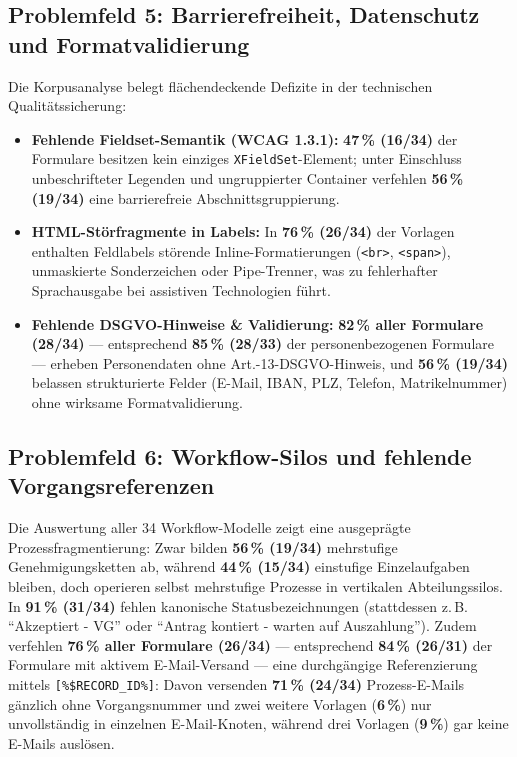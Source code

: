 \subsection{Problemfeld 5: Barrierefreiheit, Datenschutz und Formatvalidierung}
\label{subsec:problem_a11y}
Die Korpusanalyse belegt flächendeckende Defizite in der technischen Qualitätssicherung:
\begin{itemize}
    \item \textbf{Fehlende Fieldset-Semantik (WCAG 1.3.1):} \textbf{47\,\% (16/34)} der Formulare besitzen kein einziges \texttt{XFieldSet}-Element; unter Einschluss unbeschrifteter Legenden und ungruppierter Container verfehlen \textbf{56\,\% (19/34)} eine barrierefreie Abschnittsgruppierung.
    \item \textbf{HTML-Störfragmente in Labels:} In \textbf{76\,\% (26/34)} der Vorlagen enthalten Feldlabels störende Inline-Formatierungen (\texttt{<br>}, \texttt{<span>}), unmaskierte Sonderzeichen oder Pipe-Trenner, was zu fehlerhafter Sprachausgabe bei assistiven Technologien führt.
    \item \textbf{Fehlende DSGVO-Hinweise \& Validierung:} \textbf{82\,\% aller Formulare (28/34)} --- entsprechend \textbf{85\,\% (28/33)} der personenbezogenen Formulare --- erheben Personendaten ohne Art.-13-DSGVO-Hinweis, und \textbf{56\,\% (19/34)} belassen strukturierte Felder (E-Mail, IBAN, PLZ, Telefon, Matrikelnummer) ohne wirksame Formatvalidierung.
\end{itemize}

\subsection{Problemfeld 6: Workflow-Silos und fehlende Vorgangsreferenzen}
\label{subsec:workflow_silos}
Die Auswertung aller 34 Workflow-Modelle zeigt eine ausgeprägte Prozessfragmentierung: Zwar bilden \textbf{56\,\% (19/34)} mehrstufige Genehmigungsketten ab, während \textbf{44\,\% (15/34)} einstufige Einzelaufgaben bleiben, doch operieren selbst mehrstufige Prozesse in vertikalen Abteilungssilos. In \textbf{91\,\% (31/34)} fehlen kanonische Statusbezeichnungen (stattdessen z.\,B. \enquote{Akzeptiert - VG} oder \enquote{Antrag kontiert - warten auf Auszahlung}). Zudem verfehlen \textbf{76\,\% aller Formulare (26/34)} --- entsprechend \textbf{84\,\% (26/31)} der Formulare mit aktivem E-Mail-Versand --- eine durchgängige Referenzierung mittels \texttt{[\%\$RECORD\_ID\%]}: Davon versenden \textbf{71\,\% (24/34)} Prozess-E-Mails gänzlich ohne Vorgangsnummer und zwei weitere Vorlagen (\textbf{6\,\%}) nur unvollständig in einzelnen E-Mail-Knoten, während drei Vorlagen (\textbf{9\,\%}) gar keine E-Mails auslösen.

